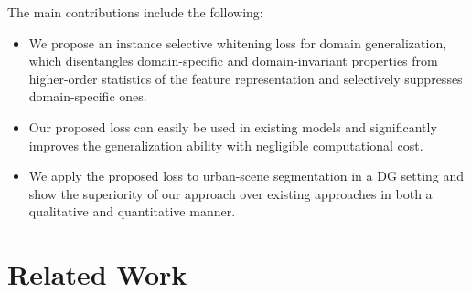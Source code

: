 \documentclass[final]{latex/cvpr}
\begin{document}
The main contributions include the following:
\vspace{-0.0cm}
\begin{itemize}
\vspace{-0.2cm}
    \item We propose an instance selective whitening loss for domain generalization, which disentangles domain-specific and domain-invariant properties from higher-order statistics of the feature representation and  selectively suppresses domain-specific ones.
\vspace{-0.2cm}
    \item Our proposed loss can easily be used in existing models and significantly improves the generalization ability with negligible computational cost.
\vspace{-0.2cm}
    \item We apply the proposed loss to urban-scene segmentation in a DG setting and show the superiority of our approach over existing approaches in both a qualitative and quantitative manner.
\end{itemize}





























\section{Related Work}
\vspace{-0.15cm}
\end{document}
